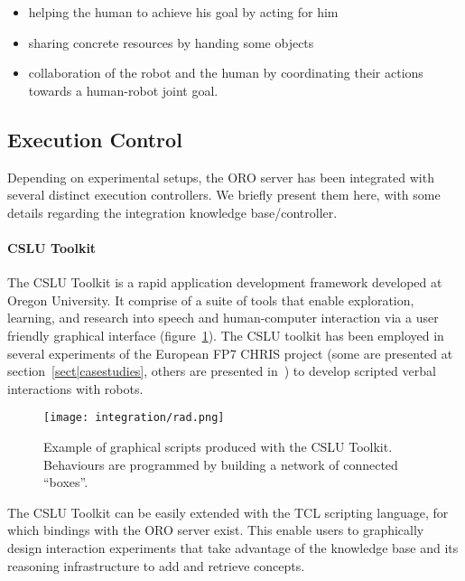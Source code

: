 \begin{itemize}

    \item helping the human to achieve his goal by acting for him

    \item sharing concrete resources by handing some objects

    \item collaboration of the robot and the human by coordinating their
    actions towards a human-robot joint goal.

\end{itemize}


\subsection{Execution Control}

Depending on experimental setups, the ORO server has been integrated with
several distinct execution controllers. We briefly present them here, with some
details regarding the integration knowledge base/controller.

\paragraph{CSLU Toolkit}
\label{sect|rad}

The CSLU Toolkit is a rapid application development framework developed at
Oregon University. It comprise of a suite of tools that enable exploration,
learning, and research into speech and human-computer interaction via a user
friendly graphical interface (figure~\ref{fig|rad}). The CSLU toolkit has been
employed in several experiments of the European FP7 CHRIS project (some are
presented at section~\ref{sect|casestudies}, others are presented
in~\cite{Lallee2010, Lallee2011}) to develop scripted verbal interactions with
robots.

\begin{figure}
    \centering
    \texttt{[image: integration/rad.png]}

    \caption{Example of graphical scripts produced with the CSLU Toolkit.
    Behaviours are programmed by building a network of connected ``boxes''.}

    \label{fig|rad}
\end{figure}

The CSLU Toolkit can be easily extended with the TCL scripting language, for
which bindings with the ORO server exist. This enable users to graphically
design interaction experiments that take advantage of the knowledge base and
its reasoning infrastructure to add and retrieve concepts.

